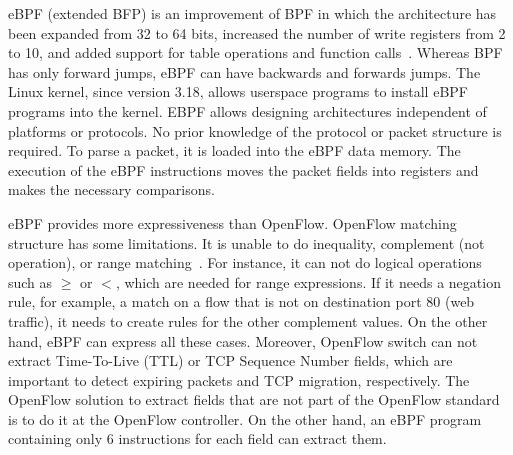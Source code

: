 eBPF (extended BFP) is an improvement of BPF in which the architecture has been expanded from 32 to 64 bits, increased the number of write registers from 2 to 10, and added support for table operations and function calls~\cite{eBPF}.
Whereas BPF has only forward jumps, eBPF can have backwards and forwards jumps.
The Linux kernel, since version 3.18, allows userspace programs to install eBPF programs into the kernel. 
EBPF allows designing architectures independent of platforms or protocols.
No prior knowledge of the protocol or packet structure is required. 
To parse a packet, it is loaded into the eBPF data memory. The execution of the eBPF instructions moves the packet fields into registers and makes the necessary comparisons.

eBPF provides more expressiveness than OpenFlow.
OpenFlow matching structure has some limitations.
It is unable to do inequality, complement (not operation), or range matching~\cite{Jouet2015OpenFlow}. 
For instance, it can not do logical operations such as $\geq$ or $<$, which are needed for range expressions. 
If it needs a negation rule, for example, a match on a flow that is not on destination port 80 (web traffic), it needs to create rules for the other complement values. 
On the other hand, eBPF can express all these cases.
Moreover, OpenFlow switch can not extract Time-To-Live (TTL) or TCP Sequence Number fields, which are important to detect expiring packets and TCP migration, respectively. 
The OpenFlow solution to extract fields that are not part of the OpenFlow standard is to do it at the OpenFlow controller. 
On the other hand, an eBPF program containing only 6 instructions for each field can extract them.

